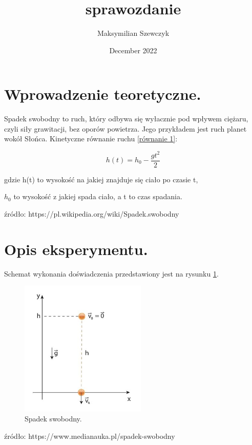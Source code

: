 \documentclass{article}
\title{sprawozdanie}
\author{Maksymilian Szewczyk}
\date{December 2022}
\begin{document}
\maketitle

\section{Wprowadzenie teoretyczne.}

Spadek swobodny to ruch, który odbywa się wyłacznie pod wpływem ciężaru, czyli siły grawitacji, bez oporów powietrza. Jego przykładem jest ruch planet wokół Słońca. Kinetyczne równanie ruchu \ref{równanie 1}:

\begin{equation}
\label{równanie 1}
    h(t) = h_0 - \frac{gt^2}{2}
\end{equation}    


gdzie h(t) to wysokość na jakiej znajduje się ciało po czasie t, 

$h_0$ to wysokość z jakiej spada ciało, a t to czas spadania.

\vspace{5mm} %

źródło: https://pl.wikipedia.org/wiki/Spadek.swobodny

\section{Opis eksperymentu.}

Schemat wykonania doświadczenia przedstawiony jest na rysunku \ref{spadek.swobodny}.

\begin{figure}[htbp]
\includegraphics[width=6cm]{zdj.jpg}
\centering
\caption{Spadek swobodny.}
\label{spadek.swobodny}
\end{figure}

\vspace{5mm} %
źródło: https://www.medianauka.pl/spadek-swobodny 
\end{document}
